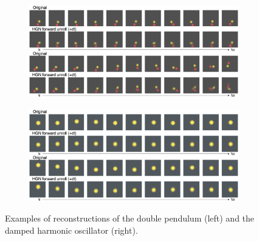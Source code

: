 \begin{figure}
    \centering
        \begin{subfigure}{.48\textwidth}
        \centering
        \includegraphics[width=\linewidth]{pictures/rollout_samples/new_chaotic_pendulum_rollouts.png}
        \label{fig:a}
    \end{subfigure}
    \begin{subfigure}{.48\textwidth}
        \centering
        \includegraphics[width=\linewidth]{pictures/rollout_samples/new_damped_spring_sample_rollout.png}
        \label{fig:b}
    \end{subfigure}
    \caption{Examples of reconstructions of the double pendulum (left) and the damped harmonic oscillator (right).}
    \label{fig:extra}
\end{figure}